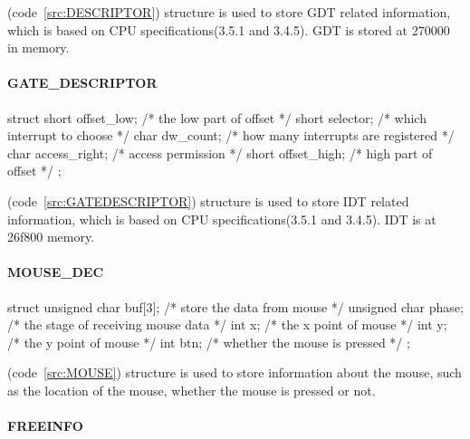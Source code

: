 \documentclass{swfcthesis}
\begin{document}
(code~\ref{src:DESCRIPTOR}) structure is
used to store GDT related information, which is based on CPU specifications(3.5.1 and
3.4.5\cite{intel_3a}). GDT is stored at 270000 in memory.


\paragraph{GATE\_DESCRIPTOR}

\begin{listing}[H]
  \begin{codeblock}
\begin{ccode}
struct 
{ 
  short offset_low;   /* the low part of offset */
  short selector;     /* which interrupt to choose */
  char dw_count;      /* how many interrupts are registered */
  char access_right;  /* access permission */
  short  offset_high; /* high part of offset */
};
\end{ccode}
  \end{codeblock}
  \caption{\emph{struct GATE\_DESCRIPTOR}}\label{src:GATEDESCRIPTOR}
\end{listing}

(code~\ref{src:GATEDESCRIPTOR}) structure is used to
store IDT related information, which is based on CPU specifications(3.5.1 and
3.4.5\cite{intel_3a}). IDT is at 26f800 memory.


\paragraph{MOUSE\_DEC}

\begin{listing}[H]
  \begin{codeblock}
\begin{ccode}
struct 
{ 
  unsigned char buf[3]; /* store the data from mouse */
  unsigned char phase;  /* the stage of receiving mouse data */
  int x;                /* the x point of mouse */
  int y;                /* the y point of mouse */
  int btn;              /* whether the mouse is pressed */
};
\end{ccode}
  \end{codeblock}
  \caption{\emph{struct MOUSE\_DEC}}\label{src:MOUSE}
\end{listing}

(code~\ref{src:MOUSE}) structure is used to store information about the mouse, such as the
location of the mouse, whether the mouse is pressed or not.

\paragraph{FREEINFO}
\end{document}
